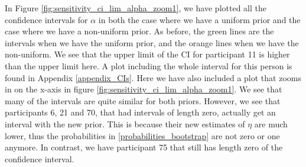 In Figure \ref{fig:sensitivity_ci_lim_alpha_zoom1}, we have plotted all the confidence intervals for $\alpha$ in both the case where we have a uniform prior and the case where we have a non-uniform prior. As before, the green lines are the intervals when we have the uniform prior, and the orange lines when we have the non-uniform. We see that the upper limit of the CI for participant 11 is higher than the upper limit here. A plot including the whole interval for this person is found in Appendix \ref{appendix_CIs}. Here we have also included a plot that zooms in on the x-axis in figure \ref{fig:sensitivity_ci_lim_alpha_zoom1}.
We see that many of the intervals are quite similar for both priors. However, we see that participants 6, 21 and 70, that had intervals of length zero, actually get an interval with the new prior. This is because their new estimates of $\eta$ are much lower, thus the probabilities in \eqref{probabilities_bootstrap} are not zero or one anymore. In contrast, we have participant 75 that still has length zero of the confidence interval.
